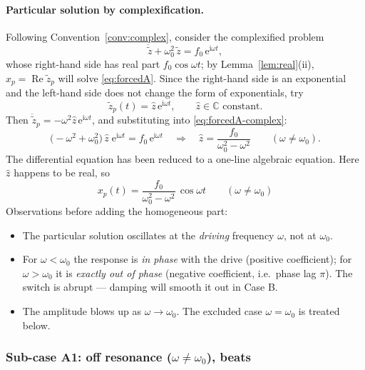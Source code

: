 \documentclass[11pt]{article}
\theoremstyle{plain}
\theoremstyle{definition}
\theoremstyle{remark}
\newcommand{\ee}{\mathrm{e}}
\newcommand{\ii}{\mathrm{i}}
\newcommand{\Rre}{\operatorname{Re}}
\begin{document}
\paragraph{Particular solution by complexification.}
Following Convention~\ref{conv:complex}, consider the complexified problem
\begin{equation}
  \ddot{\tilde z} + \omega_0^2\, \tilde z = f_0\,\ee^{\ii\omega t},
  \label{eq:forcedA-complex}
\end{equation}
whose right-hand side has real part $f_0\cos\omega t$; by
Lemma~\ref{lem:real}(ii), $x_p = \Rre \tilde z_p$ will solve
\eqref{eq:forcedA}. Since the right-hand side is an exponential and the
left-hand side does not change the form of exponentials, try
\begin{equation}
  \tilde z_p(t) = \hat z\, \ee^{\ii\omega t},
  \qquad \hat z \in\mathbb{C} \text{ constant}.
\end{equation}
Then $\ddot{\tilde z}_p = -\omega^2 \hat z\,\ee^{\ii\omega t}$, and substituting into
\eqref{eq:forcedA-complex}:
\begin{equation}
  \bigl(-\omega^2 + \omega_0^2\bigr)\,\hat z\;\ee^{\ii\omega t}
  = f_0\, \ee^{\ii\omega t}
  \quad\Longrightarrow\quad
  \hat z = \frac{f_0}{\omega_0^2 - \omega^2}
  \qquad (\omega \neq \omega_0).
\end{equation}
The differential equation has been reduced to a one-line algebraic equation.
Here $\hat z$ happens to be real, so
\begin{equation}
  \boxed{\;
  x_p(t) = \frac{f_0}{\omega_0^2-\omega^2}\,\cos\omega t
  \qquad (\omega\neq\omega_0)
  \;}
  \label{eq:forcedA-particular}
\end{equation}
Observations before adding the homogeneous part:
\begin{itemize}
  \item The particular solution oscillates at the \emph{driving} frequency
  $\omega$, not at $\omega_0$.
  \item For $\omega < \omega_0$ the response is \emph{in phase} with the
  drive (positive coefficient); for $\omega > \omega_0$ it is \emph{exactly
  out of phase} (negative coefficient, i.e.\ phase lag $\pi$). The switch is
  abrupt --- damping will smooth it out in Case B.
  \item The amplitude blows up as $\omega\to\omega_0$. The excluded case
  $\omega = \omega_0$ is treated below.
\end{itemize}

\subsubsection{Sub-case A1: off resonance ($\omega\neq\omega_0$), beats}
\end{document}
